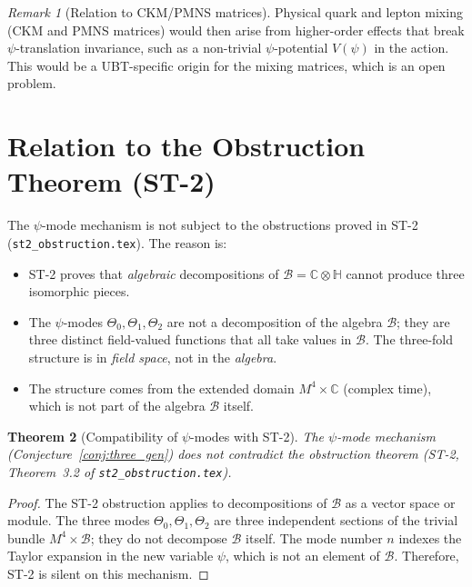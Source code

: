 \documentclass[12pt,a4paper]{article}
\newtheorem{theorem}{Theorem}[section]
\theoremstyle{remark}
\newtheorem{remark}[theorem]{Remark}
\begin{document}
\begin{remark}[Relation to CKM/PMNS matrices]
  Physical quark and lepton mixing (CKM and PMNS matrices) would then arise
  from higher-order effects that break $\psi$-translation invariance, such
  as a non-trivial $\psi$-potential $V(\psi)$ in the action.  This would be
  a UBT-specific origin for the mixing matrices, which is an open problem.
\end{remark}

\section{Relation to the Obstruction Theorem (ST-2)}
\label{sec:obstruction_relation}

The $\psi$-mode mechanism is not subject to the obstructions proved in
ST-2 (\texttt{st2\_obstruction.tex}).  The reason is:

\begin{itemize}
  \item ST-2 proves that \emph{algebraic} decompositions of
    $\mathcal{B} = \mathbb{C}\otimes\mathbb{H}$ cannot produce three
    isomorphic pieces.
  \item The $\psi$-modes $\Theta_0, \Theta_1, \Theta_2$ are not a decomposition
    of the algebra $\mathcal{B}$; they are three distinct field-valued functions
    that all take values in $\mathcal{B}$.  The three-fold structure is in
    \emph{field space}, not in the \emph{algebra}.
  \item The structure comes from the extended domain $M^4 \times \mathbb{C}$
    (complex time), which is not part of the algebra $\mathcal{B}$ itself.
\end{itemize}

\begin{theorem}[Compatibility of $\psi$-modes with ST-2]
  \label{thm:compat}
  The $\psi$-mode mechanism (Conjecture~\ref{conj:three_gen}) does not
  contradict the obstruction theorem (ST-2, Theorem~3.2 of
  \texttt{st2\_obstruction.tex}).
\end{theorem}

\begin{proof}
  The ST-2 obstruction applies to decompositions of $\mathcal{B}$ as a
  vector space or module.  The three modes $\Theta_0, \Theta_1, \Theta_2$
  are three independent sections of the trivial bundle
  $M^4 \times \mathcal{B}$; they do not decompose $\mathcal{B}$ itself.
  The mode number $n$ indexes the Taylor expansion in the new variable $\psi$,
  which is not an element of $\mathcal{B}$.  Therefore, ST-2 is silent on
  this mechanism.
\end{proof}
\end{document}
